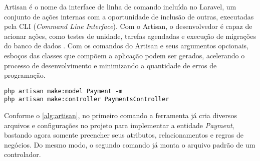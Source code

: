 Artisan é o nome da interface de linha de comando incluída no Laravel, um conjunto de ações internas com a oportunidade de inclusão de outras, executadas pela CLI (\textit{Command Line Interface}). Com o Artisan, o desenvolvedor é capaz de acionar ações, como testes de unidade, tarefas agendadas e execução de migrações do banco de dados \cite{mccool2012laravel}. Com os comandos do Artisan e seus argumentos opcionais, esboços das classes que compõem a aplicação podem ser gerados, acelerando o processo de desenvolvimento e minimizando a quantidade de erros de programação.

\begin{lstlisting}[caption={Comandos Artisan}, style=htmlcssjs, label=alg:artisan]
php artisan make:model Payment -m
php artisan make:controller PaymentsController
\end{lstlisting}

Conforme o \autoref{alg:artisan}, no primeiro comando a ferramenta já cria diversos arquivos e configurações no projeto para implementar a entidade \textit{Payment}, bastando agora somente preencher seus atributos, relacionamentos e regras de negócios. Do mesmo modo, o segundo comando já monta o arquivo padrão de um controlador.